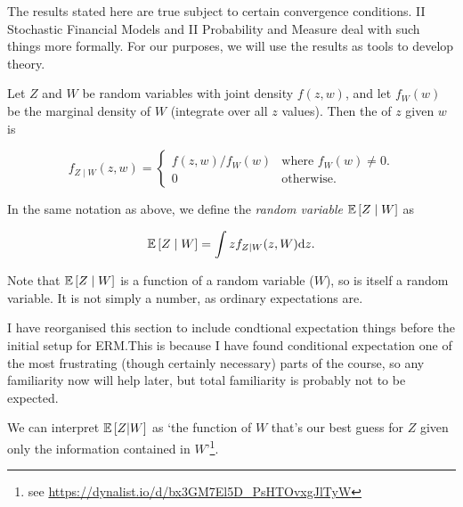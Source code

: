 \documentclass[11pt]{scrartcl}
\begin{document}
The results stated here are true subject to certain convergence conditions. II Stochastic Financial Models and II Probability and Measure deal with such things more formally. For our purposes, we will use the results as tools to develop theory.


\begin{definition}
Let $Z$ and $W$ be random variables with joint density $f(z,w)$, and let $f_W(w)$ be the marginal density of $W$ (integrate over all $z$ values). Then the  of $z$ given $w$ is

\begin{equation}
    f_{Z\mid W}(z,w) = \begin{cases}
      f(z,w) / f_W(w) & \text{where $f_W(w) \neq 0$.} \\
      0 & \text{otherwise.}
    \end{cases}
    
\end{equation}
\end{definition}

\begin{definition}
In the same notation as above, we define the \emph{random variable} $\mathbb{E} \left[ Z\mid W \right]$ as

\begin{equation}
    \mathbb{E} \left[ Z\mid W \right] = \int z f_{Z\mid W}(z,W) \mathrm{d}z.
\end{equation}
\end{definition}

Note that $\mathbb{E} \left[ Z\mid W \right]$ is a function of a random variable ($W$), so is itself a random variable. It is not simply a number, as ordinary expectations are. 

\begin{remark}
I have reorganised this section to include condtional expectation things before the initial setup for ERM.This is because I have found conditional expectation one of the most frustrating (though certainly necessary) parts of the course, so any familiarity now will help later, but total familiarity is probably not to be expected.
\end{remark}

\begin{remark}We can interpret $\mathbb{E} \left[ Z|W \right]$ as `the function of $W$ that's our best guess for $Z$ given only the information contained in $W$'\footnote{see \url{https://dynalist.io/d/bx3GM7El5D_PsHTOvxgJlTyW}}.
\label{neels remark}
\end{remark} 
\end{document}
